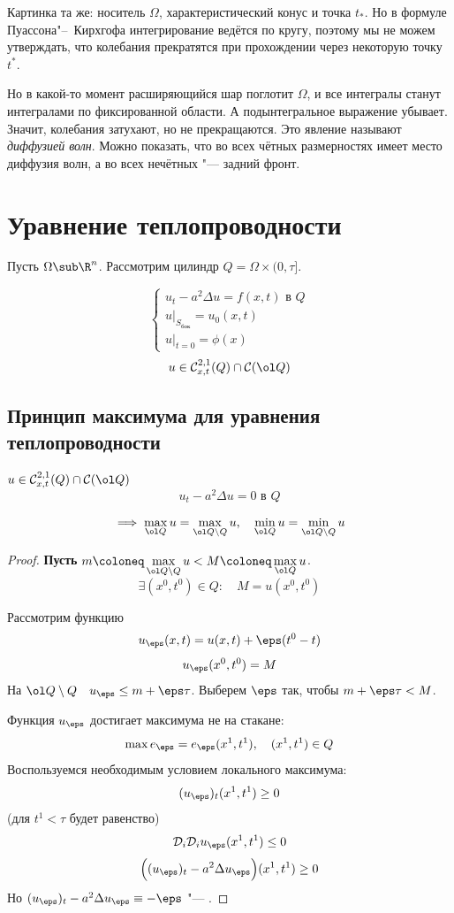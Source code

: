Картинка та же: носитель $ \Omega $, характеристический конус и точка $ t_* $.
Но в формуле Пуассона"--~Кирхгофа интегрирование ведётся по кругу, поэтому мы не можем утверждать,
что колебания прекратятся при прохождении через некоторую точку $ t^* $.

Но в какой-то момент расширяющийся шар поглотит $ \Omega $, и все интегралы станут интегралами по
фиксированной области.
А подынтегральное выражение убывает.
Значит, колебания затухают, но не прекращаются.
Это явление называют \emph{диффузией волн}.
Можно показать, что во всех чётных размерностях имеет место диффузия волн, а во всех нечётных "---
задний фронт.

\chapter{Уравнение теплопроводности}

Пусть $ \Omega \sub \R^n $.
Рассмотрим цилиндр $ Q = \Omega \times (0, \tau] $.

$$
\begin{cases}
	u_t - a^2 \Delta u = f(x, t) \text{ в } Q \\
	u\bigr|_{S_{\text{бок}}} = u_0(x, t) \\
	u\bigr|_{t = 0} = \phi(x)
\end{cases} $$
$$ u \in \mathcal C_{x,t}^{2,1} (Q) \cap \mathcal C(\ol Q) $$

\section{Принцип максимума для уравнения теплопроводности}

\begin{statement}
	$ u \in \mathcal C_{x,t}^{2,1}(Q) \cap \mathcal C(\ol Q) $
	$$ u_t - a^2 \Delta u = 0 \text{ в } Q $$

	$$ \implies \max\limits_{\ol Q} u = \max\limits_{\ol Q \setminus Q} u, \quad
	\min\limits_{\ol Q} u = \min\limits_{\ol Q \setminus Q} u $$
\end{statement}

\begin{proof}
	\textbf{Пусть} $ m \coloneq \max\limits_{\ol Q \setminus Q} u <
	M \coloneq \max\limits_{\ol Q} u $.
	$$ \exists (x^0, t^0) \in Q : \quad M = u(x^0, t^0) $$

	Рассмотрим функцию
	$$ u_\eps(x, t) = u(x, t) + \eps (t^0 - t) $$
	$$ u_\eps(x^0, t^0) = M $$
	На $ \ol Q \setminus Q \quad u_\eps \le m + \eps \tau $.
	Выберем $ \eps $ так, чтобы $ m + \eps \tau < M $.

	Функция $ u_\eps $ достигает максимума не на стакане:
	$$ \max e_\eps = e_\eps(x^1, t^1), \quad (x^1, t^1) \in Q $$
	Воспользуемся необходимым условием локального максимума:
	$$ (u_\eps)_t (x^1, t^1) \ge 0 $$
	(для $ t^1 < \tau $ будет равенство)
	$$ \mathcal D_i \mathcal D_i u_\eps (x^1, t^1) \le 0 $$
	$$ \Bigl( (u_\eps)_t - a^2 \Delta u_\eps \Bigr)(x^1, t^1) \ge 0 $$
	Но $ (u_\eps)_t - a^2 \Delta u_\eps \equiv -\eps $ "--- \contra.
\end{proof}

